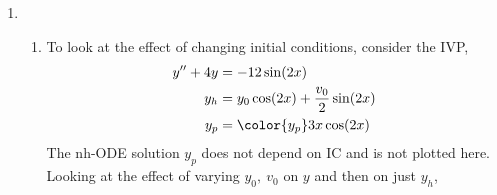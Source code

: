 \begin{enumerate}
    \item
          \begin{enumerate}
              \item To look at the effect of changing initial conditions, consider the IVP,
                    \begin{align}
                        y'' + 4y & = -12\sin (2x)                            \\
                        y_{h}    & = y_{0}\cos(2x) + \frac{v_{0}}{2}\sin(2x) \\
                        y_{p}    & = \color{y_p} 3x\cos(2x)
                    \end{align}
                    The nh-ODE solution $ y_{p} $ does not depend on IC and is not plotted
                    here. Looking at the effect of varying $ y_{0},\ v_{0} $ on $ y $ and then
                    on just $ y_{h} $,

                    \begin{figure}[H]
                        \centering
                    \end{figure}


\end{enumerate}
\end{enumerate}
